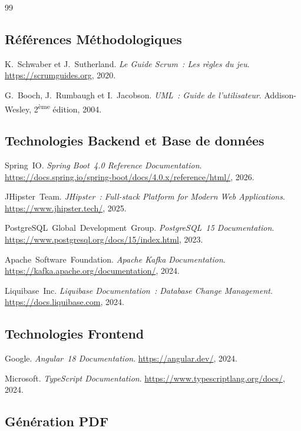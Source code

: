 \begin{thebibliography}{99}

\subsection*{Références Méthodologiques}

  K.~Schwaber et J.~Sutherland.
  \emph{Le Guide Scrum~: Les règles du jeu}.
  \url{https://scrumguides.org}, 2020.

  G.~Booch, J.~Rumbaugh et I.~Jacobson.
  \emph{UML~: Guide de l'utilisateur}.
  Addison-Wesley, 2\textsuperscript{ème} édition, 2004.

\subsection*{Technologies Backend et Base de données}

  Spring~IO.
  \emph{Spring Boot~4.0 Reference Documentation}.
  \url{https://docs.spring.io/spring-boot/docs/4.0.x/reference/html/},
  2026.

  JHipster~Team.
  \emph{JHipster~: Full-stack Platform for Modern Web Applications}.
  \url{https://www.jhipster.tech/}, 2025.

  PostgreSQL~Global~Development~Group.
  \emph{PostgreSQL~15 Documentation}.
  \url{https://www.postgresql.org/docs/15/index.html}, 2023.

  Apache~Software~Foundation.
  \emph{Apache Kafka Documentation}.
  \url{https://kafka.apache.org/documentation/}, 2024.

  Liquibase~Inc.
  \emph{Liquibase Documentation~: Database Change Management}.
  \url{https://docs.liquibase.com}, 2024.

\subsection*{Technologies Frontend}

  Google.
  \emph{Angular~18 Documentation}.
  \url{https://angular.dev/}, 2024.

  Microsoft.
  \emph{TypeScript Documentation}.
  \url{https://www.typescriptlang.org/docs/}, 2024.

\subsection*{Génération PDF}


\end{thebibliography}
